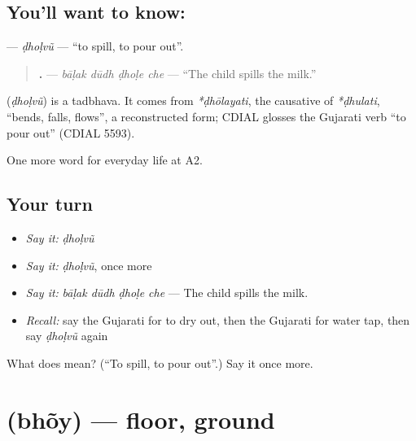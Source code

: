 \subsection*{You'll want to know: }
\textbf{} — \emph{ḍhoḷvũ} — \textquotedblleft{}to spill, to pour out\textquotedblright{}.

\begin{quote}
\textbf{   .} — \emph{bāḷak dūdh ḍhoḷe che} — \textquotedblleft{}The child spills the milk.\textquotedblright{}
\end{quote}

\begin{cousinweb}
\textbf{} (\emph{ḍhoḷvũ}) is a tadbhava. It comes from \emph{*ḍhōlayati}, the causative of \emph{*ḍhulati}, \textquotedblleft{}bends, falls, flows\textquotedblright{}, a reconstructed form; CDIAL glosses the Gujarati verb \textquotedblleft{}to pour out\textquotedblright{} (CDIAL 5593).
\end{cousinweb}

\begin{grammarlens}[title={What you've built}]
One more word for everyday life at A2.
\end{grammarlens}

\subsection*{Your turn}
\begin{itemize}
\raggedright
  \item \emph{Say it:} \emph{ḍhoḷvũ}
  \item \emph{Say it:} \emph{ḍhoḷvũ}, once more
  \item \emph{Say it:} \emph{bāḷak dūdh ḍhoḷe che} — The child spills the milk.
  \item \emph{Recall:} say the Gujarati for to dry out, then the Gujarati for water tap, then say \emph{ḍhoḷvũ} again
\end{itemize}

\begin{tcolorbox}[breakable,colback=teal!4,colframe=teal!35!black,title={Before you move on}]
What does  mean? (\textquotedblleft{}To spill, to pour out\textquotedblright{}.) Say it once more.
\end{tcolorbox}
\section[\texorpdfstring{\gu{ભોંય} (bhõy)}{ભોંય (bhõy)}]{ (bhõy) — floor, ground}

